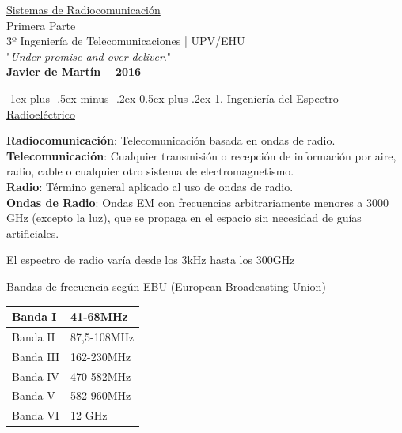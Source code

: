 \documentclass[10pt,portrait, twocolumn]{article}
\makeatletter
\renewcommand{\section}{\@startsection{section}{1}{0mm}%
                                {-1ex plus -.5ex minus -.2ex}%
                                {0.5ex plus .2ex}%
                                {\normalfont\large\bfseries}}
\makeatother
\begin{document}
\begin{framed}
	\begin{center}
    	\Large{\underline{Sistemas de Radiocomunicación}} \\
	\large{Primera Parte} \\
    	\scriptsize{3º Ingeniería de Telecomunicaciones | UPV/EHU}\\
     	"\textsl{Under-promise and over-deliver}." \\
     	\small{\textbf{Javier de Martín -- 2016}}
	\end{center}
\end{framed}


\section{\underline{1. Ingeniería del Espectro Radioeléctrico}}

\textbf{Radiocomunicación}: Telecomunicación basada en ondas de radio.\\
\textbf{Telecomunicación}: Cualquier transmisión o recepción de información por aire, radio, cable o cualquier otro sistema de electromagnetismo.\\
\textbf{Radio}: Término general aplicado al uso de ondas de radio.\\
\textbf{Ondas de Radio}: Ondas EM con frecuencias arbitrariamente menores a 3000 GHz (excepto la luz), que se propaga en el espacio sin necesidad de guías artificiales.

El espectro de radio varía desde los 3kHz hasta los 300GHz

Bandas de frecuencia según EBU (European Broadcasting Union)

	\begin{center}
\begin{tabular}{|l|l|}
\hline
Banda I   & 41-68MHz    \\ \hline
Banda II  & 87,5-108MHz \\ \hline
Banda III & 162-230MHz  \\ \hline
Banda IV  & 470-582MHz  \\ \hline
Banda V   & 582-960MHz  \\ \hline
Banda VI  & 12 GHz      \\ \hline
\end{tabular}
	\end{center}
	
\end{document}
